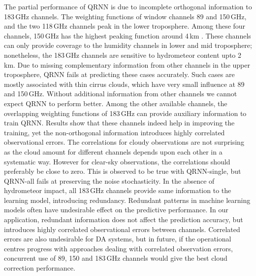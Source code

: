 \documentclass[amt, manuscript]{copernicus}
\begin{document}
The partial performance of QRNN is due to incomplete orthogonal information to 183\,GHz channels. The weighting functions of window channels 89 and 150\,GHz, and the two 118\,GHz channels peak in the lower troposphere. Among these four channels, 150\,GHz has the highest peaking function around 4\,km \citep{chen2020mwhs}. These channels can only provide coverage to the humidity channels in lower and mid troposphere; nonetheless, the 183\,GHz channels are sensitive to hydrometeor content upto 2\,km. Due to missing complementary information from other channels in the upper troposphere, QRNN fails at predicting these cases accurately. Such cases are mostly associated with thin cirrus clouds, which have very small influence at 89 and 150\,GHz. Without additional information from other channels we cannot expect QRNN to perform better. Among the other available channels, the overlapping weighting functions of 183\,GHz can provide auxiliary information to train QRNN. Results show that these channels indeed help in improving the training, yet the non-orthogonal information introduces highly correlated observational errors. The correlations for cloudy observations are not surprising as the cloud amount for different channels depends upon each other in a systematic way. However for clear-sky observations, the correlations should preferably be close to zero. This is observed to be true with QRNN-single, but QRNN-all fails at preserving the noise stochasticity. In the absence of hydrometeor impact, all 183\,GHz channels provide same information to the learning model, introducing redundancy. Redundant patterns in machine learning models often have undesirable effect on the predictive performance. In our application, redundant information does not affect the prediction accuracy, but introduces highly correlated observational errors between channels. Correlated errors are also undesirable for DA systems, but in future, if the operational centres progress with approaches dealing with correlated observation errors, concurrent use of 89, 150 and 183\,GHz channels would give the best cloud correction performance.
\end{document}
